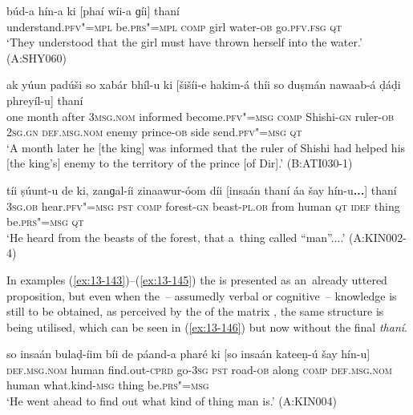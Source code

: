 \begin{exe}
\ex
\label{ex:13-143}
\gll \label{bkm:Ref190835538}búd-a hín-a ki [phaí wíi-a  ɡíi] thaní \\
understand.\textsc{pfv"=mpl} be.\textsc{prs"=mpl} \textsc{comp} girl water-\textsc{ob} go.\textsc{pfv.fsg} \textsc{qt} \\
\glt `They understood that the girl must have thrown herself into the water.' (A:SHY060)

\ex
\label{ex:13-144}
\gll ak yúun padúši so xabár bhíl-u  ki [šišíi-e hakim-á thíi so
  duṣmán nawaab-á  ḍáḍi phreyíl-u] thaní \\
one month after \textsc{3msg.nom} informed become.\textsc{pfv"=msg}  \textsc{comp} Shishi-\textsc{gn} ruler-\textsc{ob } \textsc{2sg.gn} \textsc{def.msg.nom} enemy prince-\textsc{ob} side send.\textsc{pfv"=msg} \textsc{qt}  \\
\glt `A month later he [the king] was informed that the ruler of Shishi had helped his [the king's] enemy to the territory of the prince [of Dir].' (B:ATI030-1)

\ex
\label{ex:13-145}
\gll \label{bkm:Ref190835565}tíi ṣúunt-u de ki, zanɡal-íi zinaawur-óom  díi [insaán thaní áa šay hín-u\textbf{...}] thaní \\
\textsc{3sg.ob} hear.\textsc{pfv"=msg} \textsc{pst} \textsc{comp} forest-\textsc{gn} beast-\textsc{pl.ob}  from human \textsc{qt} \textsc{idef} thing be.\textsc{prs"=msg} \textsc{qt} \\
\glt `He heard from the beasts of the forest, that a~thing called ``man''....' (A:KIN002-4) 
\end{exe}

In examples (\ref{ex:13-143})--(\ref{ex:13-145}) the  is presented as an~already uttered proposition, but even when the~-- assumedly verbal or cognitive~-- knowledge is still to be obtained, as perceived by the  of the matrix , the same structure is being utilised, which can be seen in (\ref{ex:13-146}) but now without the final \textit{thaní}. 

\begin{exe}
\ex
\label{ex:13-146}
\gll so insaán bulaḍ-íim bíi de páand-a  pharé ki [so insaán kateeṇ-ú
  šay  hín-u] \\
\textsc{def.msg.nom} human find.out-\textsc{cprd} go-\textsc{3sg} \textsc{pst} road-\textsc{ob}  along \textsc{comp} \textsc{def.msg.nom} human what.kind-\textsc{msg} thing be.\textsc{prs"=msg} \\
\glt `He went ahead to find out what kind of thing man is.' (A:KIN004) 
\end{exe}

